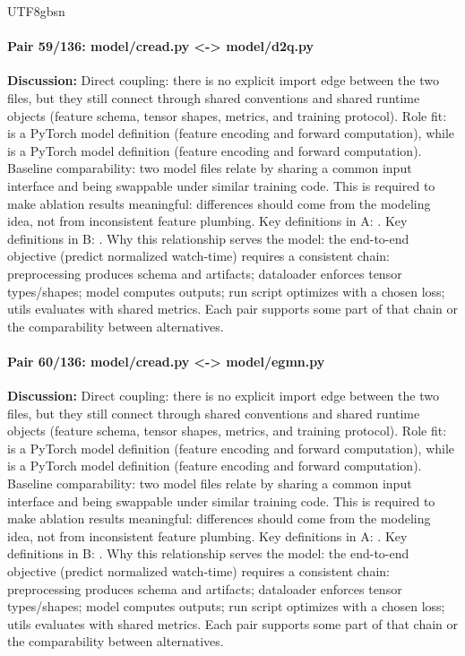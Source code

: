 \documentclass[11pt]{article}
\begin{document}
\begin{CJK*}{UTF8}{gbsn}
\paragraph{Pair 59/136: model/cread.py <-> model/d2q.py}
\textbf{Discussion:} Direct coupling: there is no explicit import edge between the two files, but they still connect through shared conventions and shared runtime objects (feature schema, tensor shapes, metrics, and training protocol). Role fit: \texttt{} is a PyTorch model definition (feature encoding and forward computation), while \texttt{} is a PyTorch model definition (feature encoding and forward computation). Baseline comparability: two model files relate by sharing a common input interface and being swappable under similar training code. This is required to make ablation results meaningful: differences should come from the modeling idea, not from inconsistent feature plumbing. Key definitions in A: \texttt{}. Key definitions in B: \texttt{}. Why this relationship serves the model: the end-to-end objective (predict normalized watch-time) requires a consistent chain: preprocessing produces schema and artifacts; dataloader enforces tensor types/shapes; model computes outputs; run script optimizes with a chosen loss; utils evaluates with shared metrics. Each pair supports some part of that chain or the comparability between alternatives.

\paragraph{Pair 60/136: model/cread.py <-> model/egmn.py}
\textbf{Discussion:} Direct coupling: there is no explicit import edge between the two files, but they still connect through shared conventions and shared runtime objects (feature schema, tensor shapes, metrics, and training protocol). Role fit: \texttt{} is a PyTorch model definition (feature encoding and forward computation), while \texttt{} is a PyTorch model definition (feature encoding and forward computation). Baseline comparability: two model files relate by sharing a common input interface and being swappable under similar training code. This is required to make ablation results meaningful: differences should come from the modeling idea, not from inconsistent feature plumbing. Key definitions in A: \texttt{}. Key definitions in B: \texttt{}. Why this relationship serves the model: the end-to-end objective (predict normalized watch-time) requires a consistent chain: preprocessing produces schema and artifacts; dataloader enforces tensor types/shapes; model computes outputs; run script optimizes with a chosen loss; utils evaluates with shared metrics. Each pair supports some part of that chain or the comparability between alternatives.


\end{CJK*}
\end{document}
